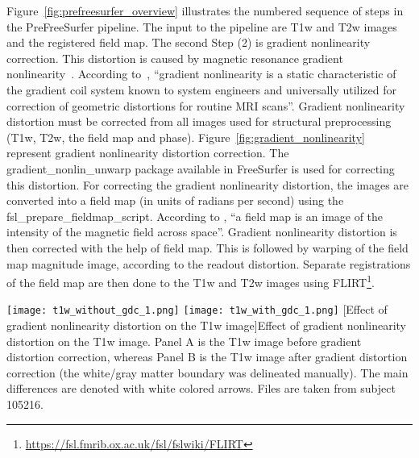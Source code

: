 \indent Figure~\ref{fig:prefreesurfer_overview} illustrates the 
numbered sequence of steps in the PreFreeSurfer pipeline. The input to 
the pipeline are T1w and T2w images and the registered field map. 
The second Step (2) is gradient nonlinearity correction. This distortion is 
caused by magnetic resonance gradient nonlinearity~\cite{Gla13}. 
According to~\cite{Zou2004}, ``gradient nonlinearity is a static 
characteristic of the gradient coil system known to system engineers 
and universally utilized for correction of geometric distortions for 
routine MRI scans''. Gradient nonlinearity distortion must be corrected 
from all images used for structural preprocessing (T1w, T2w, the field 
map and phase). Figure~\ref{fig:gradient_nonlinearity} represent 
gradient nonlinearity distortion correction. The gradient\_nonlin\_unwarp 
package available in FreeSurfer is used for correcting this distortion. 
For correcting the gradient nonlinearity distortion, the images are 
converted into a field map (in units of radians per second) using the 
fsl\_prepare\_fieldmap\_script. According to \cite{field_map}, ``a 
field map is an image of the intensity of the magnetic field across 
space''. Gradient nonlinearity distortion is then corrected with the 
help of field map. This is followed by warping of the field map 
magnitude image, according to the readout distortion. Separate 
registrations of the field map are then done to the T1w and T2w images 
using FLIRT\footnote{\url{https://fsl.fmrib.ox.ac.uk/fsl/fslwiki/FLIRT}}.

\begin{center}
  \texttt{[image: t1w\_without\_gdc\_1.png]}%
  \texttt{[image: t1w\_with\_gdc\_1.png]}
  [Effect of gradient nonlinearity distortion on the T1w image]{Effect of gradient nonlinearity distortion on the T1w image. Panel A is the T1w image before gradient distortion correction, whereas Panel B is the T1w image after gradient distortion correction (the white/gray matter boundary was delineated manually). The main differences are denoted with white colored arrows. Files are taken from subject 105216.}
  \label{fig:gradient_nonlinearity}
\end{center}

